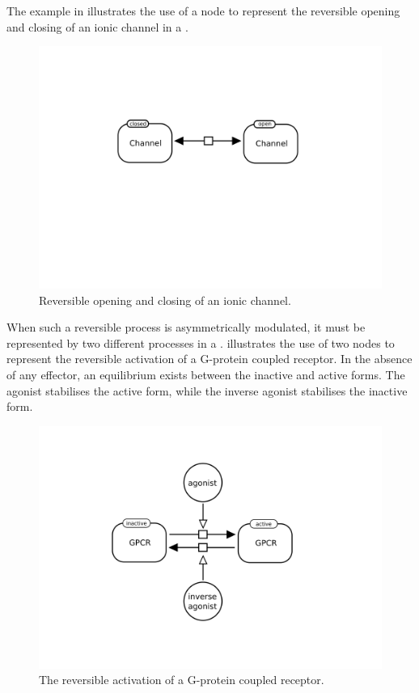 The example in  illustrates the use of a  node to represent the reversible opening and closing of an ionic channel in a \PD.

\begin{figure}[htb]
  \centering
  \includegraphics[scale = 0.3]{examples/process-reversible}
  \caption{Reversible opening and closing of an ionic channel.}
  \label{fig:techref:trans-reverse}
\end{figure}

When such a reversible process is asymmetrically modulated, it must be represented by two different processes in a \PD.   illustrates the use of two  nodes to represent the reversible activation of a G-protein coupled receptor.  In the absence of any effector, an equilibrium exists between the inactive and active forms.  The agonist stabilises the active form, while the inverse agonist stabilises the inactive form.

\begin{figure}[htb]
  \centering
  \includegraphics[scale = 0.3]{examples/process-modulated}
  \caption{The reversible activation of a G-protein coupled receptor.}
  \label{fig:techref:trans-mod}
\end{figure}


